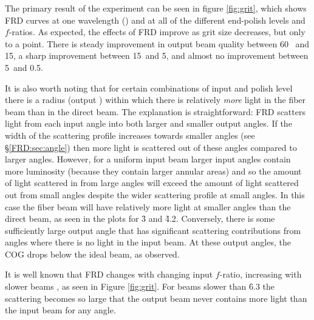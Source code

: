 The primary result of the experiment can be seen in figure
\ref{fig:grit}, which shows FRD curves at one wavelength (\filty) and at
all of the different end-polish levels and $f$-ratios. As expected,
the effects of FRD improve as grit size decreases, but only to a
point. There is steady improvement in output beam quality between 60
\mum\ and 15\mum, a sharp improvement between 15\mum\ and 5\mum,
and almost no improvement between 5\mum\ and 0.5\mum.

It is also worth noting that for certain combinations of input \fratio
and polish level there is a radius (output \fratio) within which there
is relatively \emph{more} light in the fiber beam than in the direct
beam.  The explanation is straightforward: FRD scatters light from
each input angle into both larger and smaller output angles. If the
width of the scattering profile increases towards smaller angles (see
\S\ref{FRD:sec:angle}) then more light is scattered out of these angles
compared to larger angles. However, for a uniform input beam
larger input angles contain more luminosity (because they contain
larger annular areas) and so the amount of light scattered in from large
angles will exceed the amount of light scattered out from small angles
despite the wider scattering profile at small angles. In this case the
fiber beam will have relatively more light at smaller angles than the
direct beam, as seen in the plots for \f3 and \f4.2. Conversely,
there is some sufficiently large output angle that has
significant scattering contributions from angles where there is no
light in the input beam. At these output angles, the COG drops below
the ideal beam, as observed.

It is well known that FRD changes with changing input $f$-ratio,
increasing with slower beams \citet{Ramsey88}, as seen in Figure
\ref{fig:grit}.  For beams slower than \f6.3 the scattering becomes so
large that the output beam never contains more light than the input
beam for any angle.

